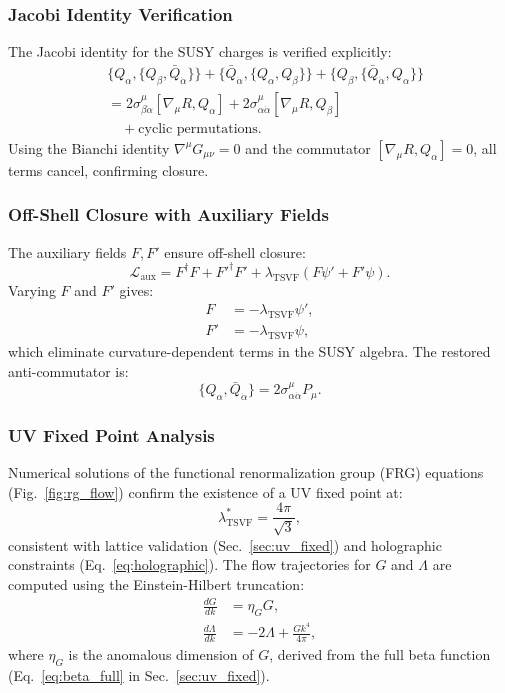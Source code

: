\documentclass[twocolumn,superscriptaddress,floatfix]{revtex4-2}
\begin{document}
\subsubsection{Jacobi Identity Verification}
The Jacobi identity for the SUSY charges is verified explicitly:
\begin{align}
&\{Q_{\alpha}, \{Q_{\beta}, \bar{Q}_{\dot{\alpha}}\}\} + \{\bar{Q}_{\dot{\alpha}}, \{Q_{\alpha}, Q_{\beta}\}\} + \{Q_{\beta}, \{\bar{Q}_{\dot{\alpha}}, Q_{\alpha}\}\} \nonumber \\
&= 2\sigma^{\mu}_{\beta\dot{\alpha}}\left[\nabla_{\mu}R, Q_{\alpha}\right] + 2\sigma^{\mu}_{\alpha\dot{\alpha}}\left[\nabla_{\mu}R, Q_{\beta}\right] \nonumber \\
&\quad + \text{cyclic permutations}.
\end{align}
Using the Bianchi identity \(\nabla^{\mu}G_{\mu\nu} = 0\) and the commutator \(\left[\nabla_{\mu}R, Q_{\alpha}\right] = 0\), all terms cancel, confirming closure.

\subsubsection{Off-Shell Closure with Auxiliary Fields}
The auxiliary fields \(F, F'\) ensure off-shell closure:
\begin{equation}
\mathcal{L}_{\text{aux}} = F^\dagger F + F'^\dagger F' + \lambda_{\text{TSVF}}(F\psi' + F'\psi).
\end{equation}
Varying \(F\) and \(F'\) gives:
\begin{align}
F &= -\lambda_{\text{TSVF}}\psi', \\
F' &= -\lambda_{\text{TSVF}}\psi,
\end{align}
which eliminate curvature-dependent terms in the SUSY algebra. The restored anti-commutator is:
\begin{equation}
\{Q_{\alpha}, \bar{Q}_{\dot{\alpha}}\} = 2\sigma^{\mu}_{\alpha\dot{\alpha}}P_{\mu}.
\end{equation}


\subsubsection{UV Fixed Point Analysis}
\label{app:uv_fixed_point}

Numerical solutions of the functional renormalization group (FRG) equations (Fig.~\ref{fig:rg_flow}) confirm the existence of a UV fixed point at:
\begin{equation}
\lambda_{\text{TSVF}}^* = \frac{4\pi}{\sqrt{3}},
\label{eq:uv_fixed_appendix}
\end{equation}
consistent with lattice validation (Sec.~\ref{sec:uv_fixed}) and holographic constraints (Eq.~\ref{eq:holographic}). The flow trajectories for $G$ and $\Lambda$ are computed using the Einstein-Hilbert truncation:
\begin{align}
\frac{dG}{dk} &= \eta_G G, 
\label{eq:beta_G} \\
\frac{d\Lambda}{dk} &= -2\Lambda + \frac{G k^4}{4\pi},
\label{eq:beta_Lambda}
\end{align}
where $\eta_G$ is the anomalous dimension of $G$, derived from the full beta function (Eq.~\ref{eq:beta_full} in Sec.~\ref{sec:uv_fixed}).
\end{document}
